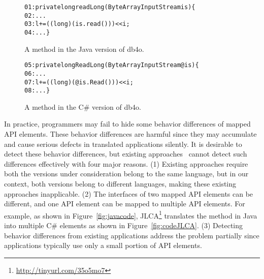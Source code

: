 \begin{figure}[t]
\begin{CodeOut}%
\begin{alltt}
01: private long readLong(ByteArrayInputStream is)\{
02:  ...
03:  l += ((long) (is.read())) << i;
04: ...\}
\end{alltt}
\end{CodeOut}\vspace*{-4ex}
\caption{A method in the Java version of db4o.}\vspace*{-2ex}
\label{fig:db4ojava}
\begin{CodeOut}%
\begin{alltt}
05: private long ReadLong(ByteArrayInputStream @is)\{
06:  ...
07:  l += ((long)(@is.Read())) << i;
08:  ...\}
\end{alltt}
\end{CodeOut}\vspace*{-4ex}
\caption{A method in the C\# version of db4o.}\vspace*{-4ex}
\label{fig:db40net}
\end{figure}

In practice, programmers may fail to hide some behavior differences of mapped API elements. These behavior differences are harmful since they may accumulate and cause serious defects in translated applications silently. It is desirable to detect these behavior differences, but existing approaches~\cite{taneja08diffgen, mckeeman1998differential} cannot detect such differences effectively with four major reasons. (1) Existing approaches require both the versions under consideration belong to the same language, but in our context, both versions belong to different languages, making these existing approaches inapplicable. (2) The interfaces of two mapped API elements can be different, and one API element can be mapped to multiple API elements. For example, as shown in Figure~\ref{fig:javacode}, JLCA\footnote{\url{http://tinyurl.com/35o5mo7}} translates the
 method in Java into multiple C\# elements as shown in Figure~\ref{fig:codeJLCA}. (3) Detecting behavior differences from existing applications address the problem partially since applications typically use only a small portion of API elements.


